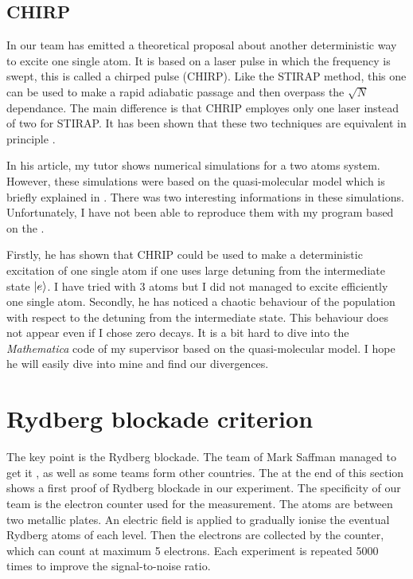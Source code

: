 \documentclass[twoside, open=right
]{scrreprt}
\newcommand{\ee}{\ensuremath{\ket{e}}\xspace}
\newcommand{\mat}{\emph{Mathematica}\xspace}
\begin{document}
\subsection{CHIRP}

\par In \cite{Ilya} our team has emitted a theoretical proposal about another deterministic way to excite one single atom. It is based on a laser pulse in which the frequency is swept, this is called a chirped pulse (CHIRP). Like the STIRAP method, this one can be used to make a rapid adiabatic passage and then overpass the $\sqrt{N}$ dependance. The main difference is that CHRIP employes only one laser instead of two for STIRAP. It has been shown that these two techniques are equivalent in principle \cite{Berg}.

\par In his article, my tutor shows numerical simulations for a two atoms system. However, these simulations were based on the quasi-molecular model which is briefly explained in . There was two interesting informations in these simulations. Unfortunately, I have not been able to reproduce them with my program based on the .

\par Firstly, he has shown that CHRIP could be used to make a deterministic excitation of one single atom if one uses large detuning from the intermediate state \ee. I have tried with 3 atoms but I did not managed to excite efficiently one single atom. Secondly, he has noticed a chaotic behaviour of the population with respect to the detuning from the intermediate state. This behaviour does not appear even if I chose zero decays. It is a bit hard to dive into the \mat code of my supervisor based on the quasi-molecular model. I hope he will easily dive into mine and find our divergences.

\section{Rydberg blockade criterion}

\par The key point is the Rydberg blockade. The team of Mark Saffman managed to get it \cite{CNOT}, as well as some teams form other countries. The  at the end of this section shows a first proof of Rydberg blockade in our experiment. The specificity of our team is the electron counter used for the measurement. The atoms are between two metallic plates. An electric field is applied to gradually ionise the eventual Rydberg atoms of each level. Then the electrons are collected by the counter, which can count at maximum 5 electrons. Each experiment is repeated 5000 times to improve the signal-to-noise ratio.
\end{document}
